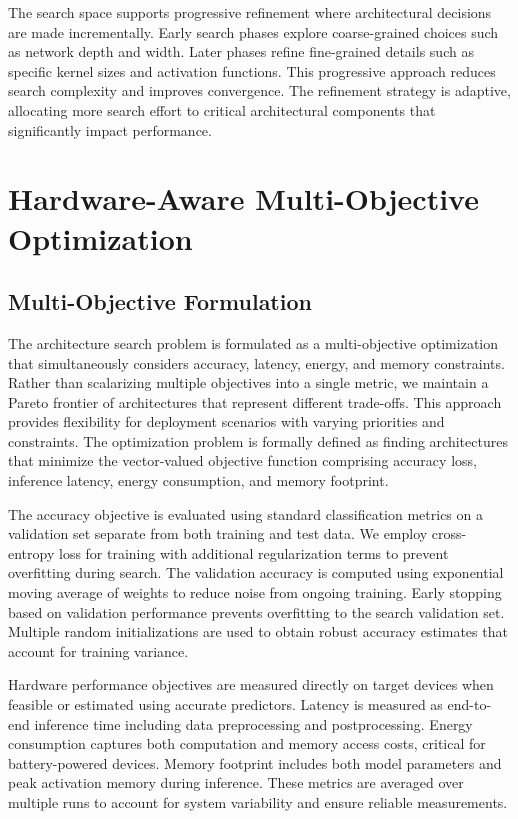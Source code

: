 \documentclass[journal]{IEEEtran}
\begin{document}
The search space supports progressive refinement where architectural decisions are made incrementally. Early search phases explore coarse-grained choices such as network depth and width. Later phases refine fine-grained details such as specific kernel sizes and activation functions. This progressive approach reduces search complexity and improves convergence. The refinement strategy is adaptive, allocating more search effort to critical architectural components that significantly impact performance.

\section{Hardware-Aware Multi-Objective Optimization}

\subsection{Multi-Objective Formulation}

The architecture search problem is formulated as a multi-objective optimization that simultaneously considers accuracy, latency, energy, and memory constraints. Rather than scalarizing multiple objectives into a single metric, we maintain a Pareto frontier of architectures that represent different trade-offs. This approach provides flexibility for deployment scenarios with varying priorities and constraints. The optimization problem is formally defined as finding architectures that minimize the vector-valued objective function comprising accuracy loss, inference latency, energy consumption, and memory footprint.

The accuracy objective is evaluated using standard classification metrics on a validation set separate from both training and test data. We employ cross-entropy loss for training with additional regularization terms to prevent overfitting during search. The validation accuracy is computed using exponential moving average of weights to reduce noise from ongoing training. Early stopping based on validation performance prevents overfitting to the search validation set. Multiple random initializations are used to obtain robust accuracy estimates that account for training variance.

Hardware performance objectives are measured directly on target devices when feasible or estimated using accurate predictors. Latency is measured as end-to-end inference time including data preprocessing and postprocessing. Energy consumption captures both computation and memory access costs, critical for battery-powered devices. Memory footprint includes both model parameters and peak activation memory during inference. These metrics are averaged over multiple runs to account for system variability and ensure reliable measurements.
\end{document}
